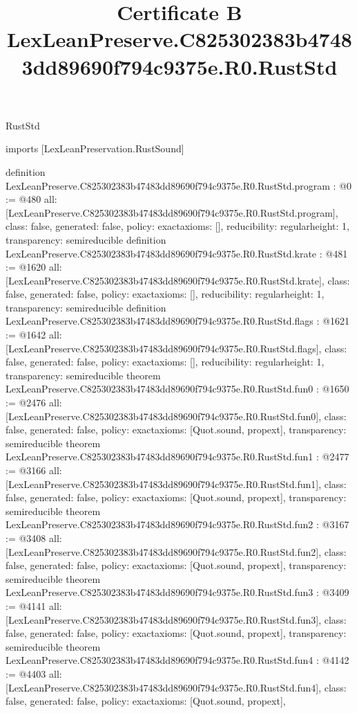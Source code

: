 \begin{lexlean}{RustStd}
\title{Certificate B LexLeanPreserve.C825302383b47483dd89690f794c9375e.R0.RustStd}
\begin{coremodule}
imports [LexLeanPreservation.RustSound]

definition LexLeanPreserve.C825302383b47483dd89690f794c9375e.R0.RustStd.program : @0 := @480 {
  all: [LexLeanPreserve.C825302383b47483dd89690f794c9375e.R0.RustStd.program],
  class: false,
  generated: false,
  policy: exact{axioms: []},
  reducibility: regular{height: 1},
  transparency: semireducible
}
definition LexLeanPreserve.C825302383b47483dd89690f794c9375e.R0.RustStd.krate : @481 := @1620 {
  all: [LexLeanPreserve.C825302383b47483dd89690f794c9375e.R0.RustStd.krate],
  class: false,
  generated: false,
  policy: exact{axioms: []},
  reducibility: regular{height: 1},
  transparency: semireducible
}
definition LexLeanPreserve.C825302383b47483dd89690f794c9375e.R0.RustStd.flags : @1621 := @1642 {
  all: [LexLeanPreserve.C825302383b47483dd89690f794c9375e.R0.RustStd.flags],
  class: false,
  generated: false,
  policy: exact{axioms: []},
  reducibility: regular{height: 1},
  transparency: semireducible
}
theorem LexLeanPreserve.C825302383b47483dd89690f794c9375e.R0.RustStd.fun0 : @1650 := @2476 {
  all: [LexLeanPreserve.C825302383b47483dd89690f794c9375e.R0.RustStd.fun0],
  class: false,
  generated: false,
  policy: exact{axioms: [Quot.sound, propext]},
  transparency: semireducible
}
theorem LexLeanPreserve.C825302383b47483dd89690f794c9375e.R0.RustStd.fun1 : @2477 := @3166 {
  all: [LexLeanPreserve.C825302383b47483dd89690f794c9375e.R0.RustStd.fun1],
  class: false,
  generated: false,
  policy: exact{axioms: [Quot.sound, propext]},
  transparency: semireducible
}
theorem LexLeanPreserve.C825302383b47483dd89690f794c9375e.R0.RustStd.fun2 : @3167 := @3408 {
  all: [LexLeanPreserve.C825302383b47483dd89690f794c9375e.R0.RustStd.fun2],
  class: false,
  generated: false,
  policy: exact{axioms: [Quot.sound, propext]},
  transparency: semireducible
}
theorem LexLeanPreserve.C825302383b47483dd89690f794c9375e.R0.RustStd.fun3 : @3409 := @4141 {
  all: [LexLeanPreserve.C825302383b47483dd89690f794c9375e.R0.RustStd.fun3],
  class: false,
  generated: false,
  policy: exact{axioms: [Quot.sound, propext]},
  transparency: semireducible
}
theorem LexLeanPreserve.C825302383b47483dd89690f794c9375e.R0.RustStd.fun4 : @4142 := @4403 {
  all: [LexLeanPreserve.C825302383b47483dd89690f794c9375e.R0.RustStd.fun4],
  class: false,
  generated: false,
  policy: exact{axioms: [Quot.sound, propext]},
}
\end{coremodule}
\end{lexlean}
